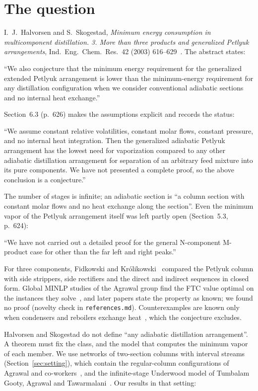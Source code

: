 \documentclass[11pt,a4paper]{report}
\begin{document}
\section{The question}

I.~J.~Halvorsen and S.~Skogestad, \emph{Minimum energy consumption in multicomponent distillation. 3. More than three
products and generalized Petlyuk arrangements}, Ind.\ Eng.\ Chem.\ Res.\ 42 (2003) 616--629~\autocite{HS3}. The
abstract states:
\begin{openquote}
``We also conjecture that the minimum energy requirement for the generalized extended Petlyuk arrangement is lower than
the minimum-energy requirement for any distillation configuration when we consider conventional adiabatic sections and
no internal heat exchange.''
\end{openquote}
Section~6.3 (p.~626) makes the assumptions explicit and records the status:
\begin{openquote}
``We assume constant relative volatilities, constant molar flows, constant pressure, and no internal heat integration.
Then the generalized adiabatic Petlyuk arrangement has the lowest need for vaporization compared to any other adiabatic
distillation arrangement for separation of an arbitrary feed mixture into its pure components. We have not presented a
complete proof, so the above conclusion is a conjecture.''
\end{openquote}
The number of stages is infinite; an adiabatic section is ``a column section with constant molar flows and no heat
exchange along the section''. Even the minimum vapor of the Petlyuk arrangement itself was left partly open
(Section~5.3, p.~624):
\begin{openquote}
``We have not carried out a detailed proof for the general N-component M-product case for other than the far left and
right peaks.''
\end{openquote}
For three components, Fidkowski and Kr\'olikowski~\autocite{FK87} compared the Petlyuk column with side strippers,
side rectifiers and the direct and indirect sequences in closed form. Global MINLP studies of the Agrawal group find
the FTC value optimal on the instances they solve~\autocite{TGAT,Nallasivam2016}, and later papers state the property
as known; we found no proof (novelty check in \texttt{references.md}). Counterexamples are known only when
condensers and reboilers exchange heat~\autocite{Mathew2019}, which the conjecture excludes.

Halvorsen and Skogestad do not define ``any adiabatic distillation arrangement''. A theorem must fix the class, and
the model that computes the minimum vapor of each member. We use networks of two-section columns with interval
streams (Section~\ref{sec:setting}), which contain the regular-column configurations of Agrawal and
co-workers~\autocite{SA10,TGAT}, and the infinite-stage Underwood model of Tumbalam Gooty, Agrawal and
Tawarmalani~\autocite{TGAT}. Our results in that setting:
\end{document}
